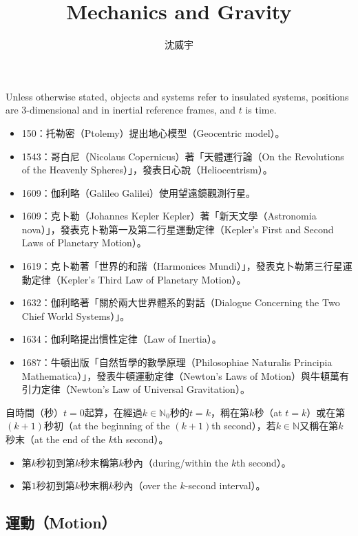 \documentclass[a4paper,12pt]{article}
\begin{document}
\title{Mechanics and Gravity}
\author{沈威宇}
\date{\temtoday}
\titletocdoc
{}
Unless otherwise stated, objects and systems refer to insulated systems, positions are 3-dimensional and in inertial reference frames, and $t$ is time.
\begin{itemize}
\item 150：托勒密（Ptolemy）提出地心模型（Geocentric model）。
\item 1543：哥白尼（Nicolaus Copernicus）著「天體運行論（On the Revolutions of the Heavenly Spheres）」，發表日心說（Heliocentrism）。
\item 1609：伽利略（Galileo Galilei）使用望遠鏡觀測行星。
\item 1609：克卜勒（Johannes Kepler Kepler）著「新天文學（Astronomia nova）」，發表克卜勒第一及第二行星運動定律（Kepler's First and Second Laws of Planetary Motion）。
\item 1619：克卜勒著「世界的和諧（Harmonices Mundi）」，發表克卜勒第三行星運動定律（Kepler's Third Law of Planetary Motion）。
\item 1632：伽利略著「關於兩大世界體系的對話（Dialogue Concerning the Two Chief World Systems）」。
\item 1634：伽利略提出慣性定律（Law of Inertia）。
\item 1687：牛頓出版「自然哲學的數學原理（Philosophiae Naturalis Principia Mathematica）」，發表牛頓運動定律（Newton's Laws of Motion）與牛頓萬有引力定律（Newton's Law of Universal Gravitation）。
\end{itemize}
自時間（秒）$t=0$起算，在經過$k\in\mathbb{N}_0$秒的$t=k$，稱在第$k$秒（at $t=k$）或在第$(k+1)$秒初（at the beginning of the $(k+1)$th second），若$k\in\mathbb{N}$又稱在第$k$秒末（at the end of the $k$th second）。
\begin{itemize}
\item 第$k$秒初到第$k$秒末稱第$k$秒內（during/within the $k$th second）。
\item 第$1$秒初到第$k$秒末稱$k$秒內（over the $k$-second interval）。
\end{itemize}
\subsection{運動（Motion）}
\end{document}
